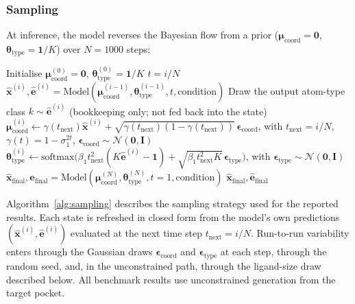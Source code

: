 \documentclass[pdflatex,sn-mathphys-num]{sn-jnl}
\theoremstyle{thmstyleone}
\theoremstyle{thmstyletwo}
\theoremstyle{thmstylethree}
\begin{document}
\subsubsection{Sampling}

At inference, the model reverses the Bayesian flow from a prior (\(\boldsymbol{\mu}_{\text{coord}} = \mathbf{0}\), \(\boldsymbol{\theta}_{\text{type}} = \mathbf{1}/K\)) over \(N = 1000\) steps:

\begin{algorithm}[H]
\caption{NA2smol sampling}
\label{alg:sampling}
\begin{algorithmic}
\State Initialise \(\boldsymbol{\mu}_{\text{coord}}^{(0)} = \mathbf{0}\), \(\boldsymbol{\theta}_{\text{type}}^{(0)} = \mathbf{1}/K\)
 \State \(t = i/N\)
 \State \(\hat{\mathbf{x}}^{(i)}, \hat{\mathbf{e}}^{(i)} = \text{Model}(\boldsymbol{\mu}_{\text{coord}}^{(i-1)}, \boldsymbol{\theta}_{\text{type}}^{(i-1)}, t, \text{condition})\)
 \State Draw the output atom-type class \(k \sim \hat{\mathbf{e}}^{(i)}\) (bookkeeping only; not fed back into the state)
 \State \(\boldsymbol{\mu}_{\text{coord}}^{(i)} \gets \gamma(t_{\text{next}}) \hat{\mathbf{x}}^{(i)} + \sqrt{\gamma(t_{\text{next}})(1-\gamma(t_{\text{next}}))}\, \boldsymbol{\epsilon}_{\text{coord}}\), with \(t_{\text{next}} = i/N\), \(\gamma(t)=1-\sigma_1^{2t}\), \(\boldsymbol{\epsilon}_{\text{coord}} \sim \mathcal{N}(\mathbf{0},\mathbf{I})\)
 \State \(\boldsymbol{\theta}_{\text{type}}^{(i)} \gets \mathrm{softmax}\bigl(\beta_1 t_{\text{next}}^2 (K \hat{\mathbf{e}}^{(i)} - \mathbf{1}) + \sqrt{\beta_1 t_{\text{next}}^2 K}\, \boldsymbol{\epsilon}_{\text{type}}\bigr)\), with \(\boldsymbol{\epsilon}_{\text{type}} \sim \mathcal{N}(\mathbf{0},\mathbf{I})\)
\EndFor
\State \(\hat{\mathbf{x}}_{\text{final}}, \hat{\mathbf{e}}_{\text{final}} = \text{Model}(\boldsymbol{\mu}_{\text{coord}}^{(N)}, \boldsymbol{\theta}_{\text{type}}^{(N)}, t=1, \text{condition})\)
\State \Return \(\hat{\mathbf{x}}_{\text{final}}, \hat{\mathbf{e}}_{\text{final}}\)
\end{algorithmic}
\end{algorithm}

Algorithm~\ref{alg:sampling} describes the sampling strategy used for the reported results. Each state is refreshed in closed form from the model's own predictions \((\hat{\mathbf{x}}^{(i)}, \hat{\mathbf{e}}^{(i)})\) evaluated at the next time step \(t_{\text{next}}=i/N\). Run-to-run variability enters through the Gaussian draws \(\boldsymbol{\epsilon}_{\text{coord}}\) and \(\boldsymbol{\epsilon}_{\text{type}}\) at each step, through the random seed, and, in the unconstrained path, through the ligand-size draw described below. All benchmark results use unconstrained generation from the target pocket.
\end{document}
